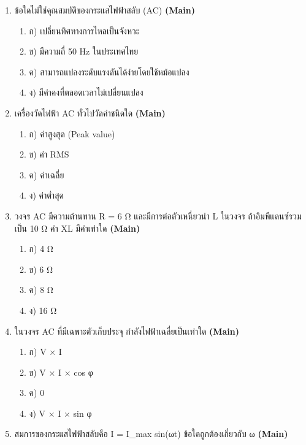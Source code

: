 \documentclass[12pt]{article}
\begin{document}
\begin{enumerate}[label=\arabic*.]
\begin{enumerate}[label=)]
\item ก) Z = 10 Ω, tan φ = 1
\item ข) Z = 10 Ω, tan φ = 0.8
\item ค) Z = 17.2 Ω, tan φ = 1
\item ง) Z = 15.6 Ω, tan φ = 0.5
\end{enumerate}
\item ข้อใดไม่ใช่คุณสมบัติของกระแสไฟฟ้าสลับ (AC) \hfill \textbf{\small (Main)}
\begin{enumerate}[label=)]
\item ก) เปลี่ยนทิศทางการไหลเป็นจังหวะ
\item ข) มีความถี่ 50 Hz ในประเทศไทย
\item ค) สามารถแปลงระดับแรงดันได้ง่ายโดยใช้หม้อแปลง
\item ง) มีค่าคงที่ตลอดเวลาไม่เปลี่ยนแปลง
\end{enumerate}
\item เครื่องวัดไฟฟ้า AC ทั่วไปวัดค่าชนิดใด \hfill \textbf{\small (Main)}
\begin{enumerate}[label=)]
\item ก) ค่าสูงสุด (Peak value)
\item ข) ค่า RMS
\item ค) ค่าเฉลี่ย
\item ง) ค่าต่ำสุด
\end{enumerate}
\item วงจร AC มีความต้านทาน R = 6 Ω และมีการต่อตัวเหนี่ยวนำ L ในวงจร ถ้าอิมพีแดนซ์รวมเป็น 10 Ω ค่า XL มีค่าเท่าใด \hfill \textbf{\small (Main)}
\begin{enumerate}[label=)]
\item ก) 4 Ω
\item ข) 6 Ω
\item ค) 8 Ω
\item ง) 16 Ω
\end{enumerate}
\item ในวงจร AC ที่มีเฉพาะตัวเก็บประจุ กำลังไฟฟ้าเฉลี่ยเป็นเท่าใด \hfill \textbf{\small (Main)}
\begin{enumerate}[label=)]
\item ก) V × I
\item ข) V × I × cos φ
\item ค) 0
\item ง) V × I × sin φ
\end{enumerate}
\item สมการของกระแสไฟฟ้าสลับคือ I = I\_max sin(ωt) ข้อใดถูกต้องเกี่ยวกับ ω \hfill \textbf{\small (Main)}
\begin{enumerate}[label=)]

\end{enumerate}
\end{enumerate}
\end{document}
